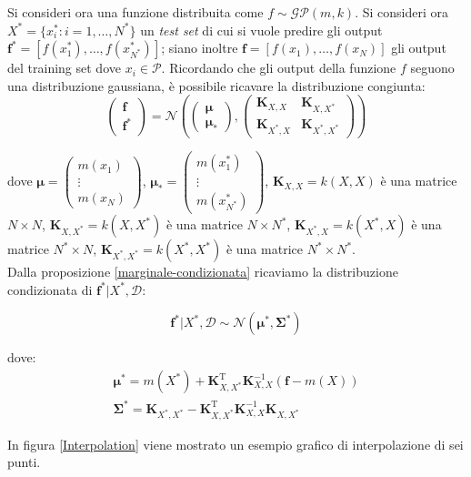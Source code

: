 \newpage
Si consideri ora una funzione distribuita come $f\sim \mathcal{GP}(m,k)$. 
Si consideri ora $X^*=\{x_i^*:i=1,\dots,N^*\}$ un \textit{test set} di cui si vuole predire gli output $\bm{f^*}=\left[f(x^*_1), \dots, f(x^*_{N^*}) \right]$; siano inoltre  $\bm{f}=\left[f(x_1), \dots, f(x_N) \right]$ gli output del training set dove $x_i\in \mathcal{P}$. Ricordando che gli output della funzione $f$ seguono una distribuzione gaussiana, è possibile ricavare la distribuzione congiunta:
\[
\begin{pmatrix}
\bm{f}\\
\bm{f^*}
\end{pmatrix}
=
\mathcal{N}\left(
\begin{pmatrix}
\bm{\mu}\\
\bm{\mu_*}
\end{pmatrix},
\begin{pmatrix}
\bm{K}_{X,X} & \bm{K}_{X,X^*}\\
\bm{K}_{X^*,X} & \bm{K}_{X^*,X^*}
\end{pmatrix}
\right)
\]

dove $\bm{\mu}=\begin{pmatrix}m(x_1) \\ \vdots \\ m(x_N)\end{pmatrix}$, $\bm{\mu_*}=\begin{pmatrix}m(x^*_1) \\ \vdots \\ m(x^*_{N^*})\end{pmatrix}$, $\bm{K}_{X,X}=k(X,X)$ è una matrice $N\times N$, $\bm{K}_{X,X^*}=k(X,X^*)$ è una matrice $N\times N^*$, $\bm{K}_{X^*,X}=k(X^*,X)$ è una matrice $N^*\times N$, $\bm{K}_{X^*,X^*}=k(X^*,X^*)$ è una matrice $N^*\times N^*$.\\

Dalla proposizione \ref{marginale-condizionata} ricaviamo la distribuzione condizionata di $\bm{f^*} | X^*, \mathcal{D}$:

\[
\bm{f^*} | X^*, \mathcal{D} \sim \mathcal{N}(\bm{\mu^*}, \bm{\Sigma^*})
\]

dove: 
\[
\begin{split}
\bm{\mu^*}=m(X^*)+\bm{K}_{X,X^*}^\text{T}\bm{K}^{-1}_{X,X}(\bm{f}-m(X))\\
\bm{\Sigma^*}=\bm{K}_{X^*,X^*}-\bm{K}_{X,X^*}^\text{T}\bm{K}^{-1}_{X,X}\bm{K}_{X,X^*}
\end{split}
\]


\newpage 
In figura \ref{Interpolation} viene mostrato un esempio grafico di interpolazione di sei punti.


